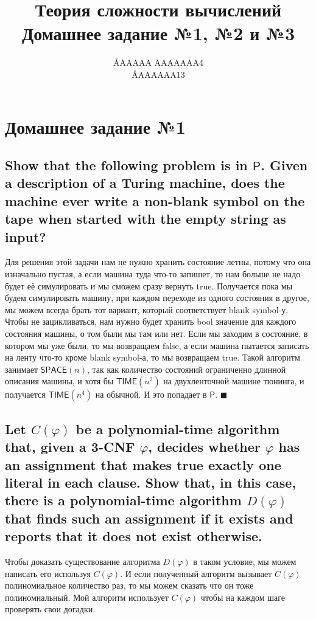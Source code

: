 \documentclass{article}
\title{Теория сложности вычислений \\ Домашнее задание №1, №2 и №3}
\author{\AA{AAAAA AAAAAAA}{4} \\ \AA{AAAAAA}{13}}
\let\temp\phi
\let\phi\varphi
\let\varphi\temp
\begin{document}
  \maketitle

  \section{Домашнее задание №1}
  \setcounter{subsection}{9}
  \subsection{Show that the following problem is in $\mathsf{P}$. Given a description of a Turing machine, does the machine ever write a non-blank symbol on the tape when started with the empty string as input?}
  Для решения этой задачи нам не нужно хранить состояние летны, потому что она изначально пустая,
  а если машина туда что-то запишет, то нам больше не надо будет её симулировать и мы сможем сразу вернуть true.
  Получается пока мы будем симулировать машину, при каждом переходе из одного состояния в другое,
  мы можем всегда брать тот вариант, который соответствует blank symbol-у.
  Чтобы не зацикливаться, нам нужно будет хранить bool значение для каждого состояния машины, о том были мы там или нет.
  Если мы заходим в состояние, в котором мы уже были, то мы возвращаем false,
  а если машина пытается записать на ленту что-то кроме blank symbol-а, то мы возвращаем true.
  Такой алгоритм занимает $\mathsf{SPACE}(n)$, так как количество состояний ограниченно длинной описания машины,
  и хотя бы $\mathsf{TIME}(n^2)$ на двухленточной машине тюнинга, и получается $\mathsf{TIME}(n^4)$ на обычной.
  И это попадает в $\mathsf{P}$.
  $\blacksquare$

  \subsection{Let $C(\phi)$ be a polynomial-time algorithm that, given a 3-CNF $\phi$, decides whether $\phi$ has an assignment that makes true exactly one literal in each clause. Show that, in this case, there is a polynomial-time algorithm $D(\phi)$ that finds such an assignment if it exists and reports that it does not exist otherwise.}
  Чтобы доказать существование алгоритма $D(\phi)$ в таком условие, мы можем написать его используя $C(\phi)$.
  И если полученный алгоритм вызывает $C(\phi)$ полиномиальное количество раз, то мы можем сказать что он тоже полиномиальный.
  Мой алгоритм использует $C(\phi)$ чтобы на каждом шаге проверять свои догадки.
\end{document}
